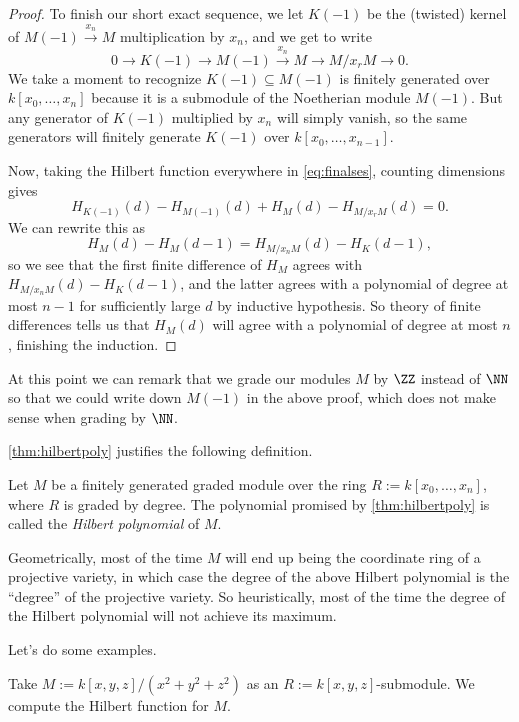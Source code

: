 \begin{proof}
	To finish our short exact sequence, we let $K(-1)$ be the (twisted) kernel of $M(-1)\stackrel{x_n}\to M$ multiplication by $x_n$, and we get to write
	\[0\to K(-1)\to M(-1)\stackrel{x_n}\to M\to M/x_rM\to 0.\label{eq:finalses}\tag{$*$}\]
	We take a moment to recognize $K(-1)\subseteq M(-1)$ is finitely generated over $k[x_0,\ldots,x_n]$ because it is a submodule of the Noetherian module $M(-1)$. But any generator of $K(-1)$ multiplied by $x_n$ will simply vanish, so the same generators will finitely generate $K(-1)$ over $k[x_0,\ldots,x_{n-1}]$.

	Now, taking the Hilbert function everywhere in \autoref{eq:finalses}, counting dimensions gives
	\[H_{K(-1)}(d)-H_{M(-1)}(d)+H_M(d)-H_{M/x_rM}(d)=0.\]
	We can rewrite this as
	\[H_M(d)-H_M(d-1)=H_{M/x_nM}(d)-H_K(d-1),\]
	so we see that the first finite difference of $H_M$ agrees with $H_{M/x_nM}(d)-H_K(d-1)$, and the latter agrees with a polynomial of degree at most $n-1$ for sufficiently large $d$ by inductive hypothesis. So theory of finite differences tells us that $H_M(d)$ will agree with a polynomial of degree at most $n$, finishing the induction.
\end{proof}
\begin{remark}[Nir]
	At this point we can remark that we grade our modules $M$ by $\ZZ$ instead of $\NN$ so that we could write down $M(-1)$ in the above proof, which does not make sense when grading by $\NN$.
\end{remark}
\autoref{thm:hilbertpoly} justifies the following definition.
\begin{definition}
	Let $M$ be a finitely generated graded module over the ring $R:=k[x_0,\ldots,x_n]$, where $R$ is graded by degree. The polynomial promised by \autoref{thm:hilbertpoly} is called the \textit{Hilbert polynomial} of $M$.
\end{definition}
\begin{remark}
	Geometrically, most of the time $M$ will end up being the coordinate ring of a projective variety, in which case the degree of the above Hilbert polynomial is the ``degree'' of the projective variety. So heuristically, most of the time the degree of the Hilbert polynomial will not achieve its maximum.
\end{remark}
Let's do some examples.
\begin{exe}
	Take $M:=k[x,y,z]/\left(x^2+y^2+z^2\right)$ as an $R:=k[x,y,z]$-submodule. We compute the Hilbert function for $M$.
\end{exe}
